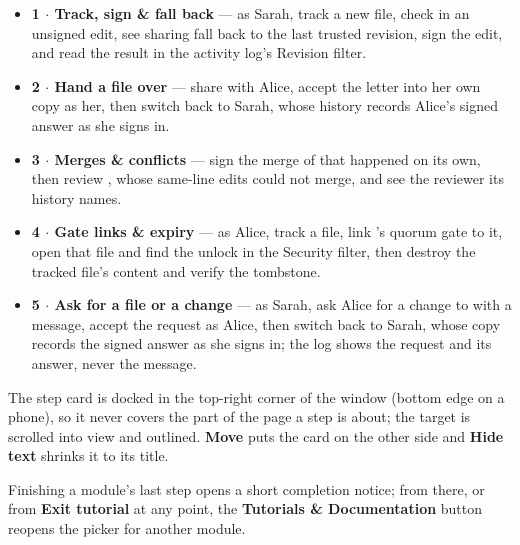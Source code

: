 \begin{itemize}
  \item \textbf{1 $\cdot$ Track, sign \& fall back} --- as Sarah, track a
  new file, check in an unsigned edit, see sharing fall back to the last
  trusted revision, sign the edit, and read the result in the activity
  log's Revision filter.
  \item \textbf{2 $\cdot$ Hand a file over} --- share  with
  Alice, accept the letter into her own copy as her, then switch back to
  Sarah, whose history records Alice's signed answer as she signs in.
  \item \textbf{3 $\cdot$ Merges \& conflicts} --- sign the merge of
   that happened on its own, then review ,
  whose same-line edits could not merge, and see the reviewer its history
  names.
  \item \textbf{4 $\cdot$ Gate links \& expiry} --- as Alice, track a file,
  link 's quorum gate to it, open that file and find the
  unlock in the Security filter, then destroy the tracked file's content and
  verify the tombstone.
  \item \textbf{5 $\cdot$ Ask for a file or a change} --- as Sarah, ask Alice
  for a change to  with a message, accept the request as
  Alice, then switch back to Sarah, whose copy records the signed answer as
  she signs in; the log shows the request and its answer, never the message.
\end{itemize}

The step card is docked in the top-right corner of the window (bottom edge
on a phone), so it never covers the part of the page a step is about; the
target is scrolled into view and outlined. \textbf{Move} puts the card on the
other side and \textbf{Hide text} shrinks it to its title.

Finishing a module's last step opens a short completion notice; from
there, or from \textbf{Exit tutorial} at any point, the \textbf{Tutorials
\& Documentation} button reopens the picker for another module.
